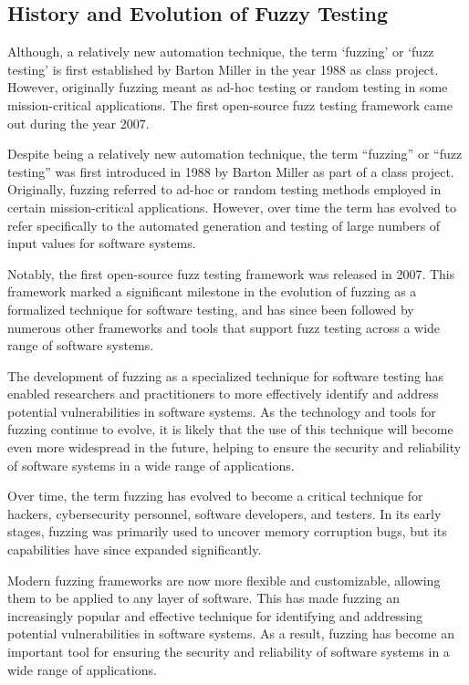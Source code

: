 \subsection{History and Evolution of Fuzzy Testing}
Although, a relatively new automation technique, the term `fuzzing' or `fuzz testing'
is first established by Barton Miller in the year 1988\cite{takanen2009fuzzing} as class project.
However, originally fuzzing meant as ad-hoc testing or random testing in some mission-critical
applications. The first open-source fuzz testing framework came out during the year
2007\cite{takanen2009fuzzing}.

Despite being a relatively new automation technique, the term ``fuzzing'' or  ``fuzz testing''
was first introduced in 1988 by Barton Miller as part of a class project\cite{takanen2009fuzzing}.
Originally, fuzzing referred to ad-hoc or random testing methods employed in certain mission-critical
applications. However, over time the term has evolved to refer specifically to the automated
generation and testing of large numbers of input values for software systems.

Notably, the first open-source fuzz testing framework was released in 2007\cite{takanen2009fuzzing}.
This framework marked a significant milestone in the evolution of fuzzing as a formalized technique
for software testing, and has since been followed by numerous other frameworks and tools that
support fuzz testing across a wide range of software systems.

The development of fuzzing as a specialized technique for software testing has enabled
researchers and practitioners to more effectively identify and address potential vulnerabilities
in software systems. As the technology and tools for fuzzing continue to evolve, it is likely that
the use of this technique will become even more widespread in the future, helping to ensure the
security and reliability of software systems in a wide range of applications.


Over time, the term fuzzing has evolved to become a critical technique for hackers,
cybersecurity personnel, software developers, and testers. In its early stages,
fuzzing was primarily used to uncover memory corruption bugs, but its capabilities
have since expanded significantly.

Modern fuzzing frameworks are now more flexible and customizable, allowing them
to be applied to any layer of software. This has made fuzzing an increasingly
popular and effective technique for identifying and addressing potential
vulnerabilities in software systems. As a result, fuzzing has become an
important tool for ensuring the security and reliability of software systems
in a wide range of applications.\newline

